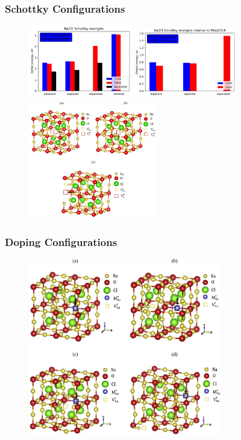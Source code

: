 \documentclass{beamer}
\begin{document}
\begin{frame}
\frametitle{ Schottky Configurations}

\begin{figure}
\includegraphics[width=0.4\textwidth]{schottky_na2o_absolute.jpg}
\includegraphics[width=0.4\textwidth]{schottky_na2o_relative.jpg}
\includegraphics[width=0.5\textwidth]{na2o_configs.png}
\end{figure}

\end{frame}

\begin{frame}
\frametitle{Doping Configurations}

\begin{figure}
\includegraphics[width=0.75\textwidth]{doping_configs.jpg}
\end{figure}

\end{frame}
\end{document}
